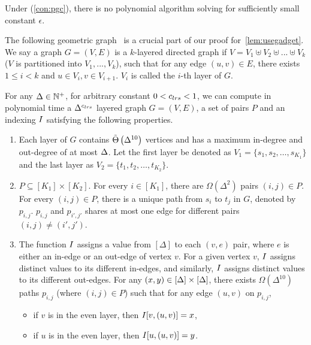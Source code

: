 \begin{corollary}\label{cor:smallmain}
	Under \conj{} (\cref{con:pgc}), there is no polynomial algorithm solving  for sufficiently small constant $\epsilon$.
\end{corollary}

The following geometric graph~\cite{HuangP21} is a crucial part of our proof for~\cref{lem:usegadget}. We say a graph $G=(V,E)$ is a $k$-layered directed graph if $V=V_1\uplus V_2\uplus...\uplus V_k$ ($V$ is partitioned into $V_1,...,V_k$), such that for any edge $(u,v)\in E$, there exists $1\le i<k$ and $u\in V_i,v\in V_{i+1}$. $V_i$ is called the $i$-th layer of $G$.

\begin{lemma}\label{lem:geograph}
	For any $\Delta\in\mathbb{N}^+$, for arbitrary constant $0<{c_{lrs}}{}< 1$, we can compute in polynomial time a $\Delta^{c_{lrs}}$ layered graph $G=(V,E)$, a set of pairs $P$ and an indexing $I{}$ satisfying the following properties.
 
	\begin{enumerate}
            \item Each layer of $G$ contains $\tilde{\Theta}\left(\Delta^{10}\right)$ vertices and has a maximum in-degree and out-degree of at most $\Delta$. Let the first layer be denoted as $V_1 = \{s_1, s_2, \dots, s_{K_1}\}$ and the last layer as $V_2 = \{t_1, t_2, \dots, t_{K_2}\}$. \label{geoitem1}

		\item $P \subseteq [K_1] \times [K_2]$. For every $i\in[K_1]$, there are $\Omega(\Delta^2)$ pairs $(i,j)\in P$. For every $(i,j)\in P$, there is a unique path from $s_i$ to $t_j$ in $G$, denoted by $p_{i,j}$. $p_{i,j}$ and $p_{i',j'}$ shares at most one edge for different pairs $(i,j)\not=(i',j')$. \label{geoitem3}
		\item The function $I{}$ assigns a value from $[\Delta]$ to each $(v, e)$ pair, where $e$ is either an in-edge or an out-edge of vertex $v$. For a given vertex $v$, $I{}$ assigns distinct values to its different in-edges, and similarly, $I{}$ assigns distinct values to its different out-edges.  For any $(x,y)\in[\Delta]\times[\Delta]$, there exists $\Omega(\Delta^{10})$ paths $p_{i,j}$ (where $(i,j)\in P$) such that for any edge $(u,v)$ on $p_{i,j}$,\label{geoitem4}
                \begin{itemize}
                    \item if $v$ is in the even layer, then $I{}[v,(u,v)]=x$, 
                    \item if $u$ is in the even layer, then $I{}[u,(u,v)]=y$.
                \end{itemize}
	\end{enumerate}
 
\end{lemma}
